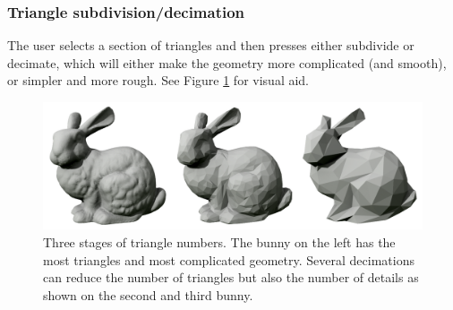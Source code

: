 \subsubsection{Triangle subdivision/decimation}
The user selects a section of triangles and then presses either subdivide or decimate, which will either make the geometry more complicated (and smooth), or simpler and more rough. See Figure \ref{fig:decimated} for visual aid.

\begin{figure}
	\centering
	\includegraphics[scale=0.25]{images/decimated_bunny.png}
	\caption{Three stages of triangle numbers. The bunny on the left has the most triangles and most complicated geometry. Several decimations can reduce the number of triangles but also the number of details as shown on the second and third bunny.}
	\label{fig:decimated}
\end{figure}
